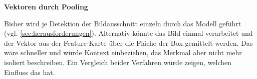 \vspace{\baselineskip}

\noindent \textbf{Vektoren durch Pooling}

\noindent Bisher wird je Detektion der Bildausschnitt einzeln durch das Modell geführt (vgl. \cref{sec:herausforderungen}). Alternativ könnte das Bild einmal verarbeitet und der Vektor aus der Feature-Karte über die Fläche der Box gemittelt werden. Das wäre schneller und würde Kontext einbeziehen, das Merkmal aber nicht mehr isoliert beschreiben. Ein Vergleich beider Verfahren würde zeigen, welchen Einfluss das hat.